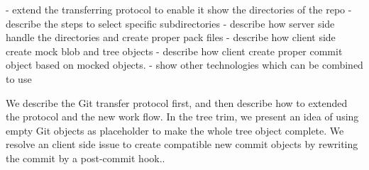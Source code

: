 \documentclass[preprint]{sigplanconf}
\begin{document}
  - extend the transferring protocol to enable it show the directories of the repo
  - describe the steps to select specific subdirectories
  - describe how server side handle the directories and create proper pack files
  - describe how client side create mock blob and tree objects 
  - describe how client create proper commit object based on mocked objects.
- show other technologies which can be combined to use 

We describe the Git transfer protocol first, and then describe how to extended the protocol and the new work flow.
In the tree trim, we present an idea of using empty Git objects as placeholder to make the whole tree object complete.
We resolve an client side issue to create compatible new commit objects by rewriting the commit by a post-commit hook..
\end{document}
